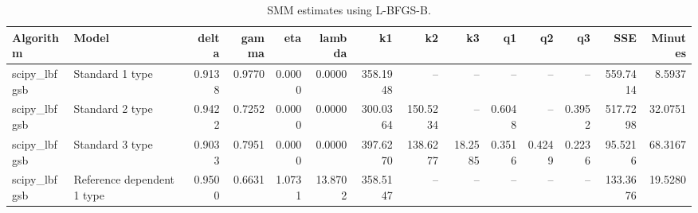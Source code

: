 \begin{table}
\caption{SMM estimates using L-BFGS-B.}
\label{tab:lbfgsb_estimates}
\begin{tabular}{llrrrrrrrrrrrr}
\toprule
Algorithm & Model & delta & gamma & eta & lambda & k1 & k2 & k3 & q1 & q2 & q3 & SSE & Minutes \\
\midrule
scipy_lbfgsb & Standard 1 type & 0.9138 & 0.9770 & 0.0000 & 0.0000 & 358.1948 & -- & -- & -- & -- & -- & 559.7414 & 8.5937 \\
scipy_lbfgsb & Standard 2 type & 0.9422 & 0.7252 & 0.0000 & 0.0000 & 300.0364 & 150.5234 & -- & 0.6048 & -- & 0.3952 & 517.7298 & 32.0751 \\
scipy_lbfgsb & Standard 3 type & 0.9033 & 0.7951 & 0.0000 & 0.0000 & 397.6270 & 138.6277 & 18.2585 & 0.3516 & 0.4249 & 0.2236 & 95.5216 & 68.3167 \\
scipy_lbfgsb & Reference dependent 1 type & 0.9500 & 0.6631 & 1.0731 & 13.8702 & 358.5147 & -- & -- & -- & -- & -- & 133.3676 & 19.5280 \\
\bottomrule
\end{tabular}
\end{table}
